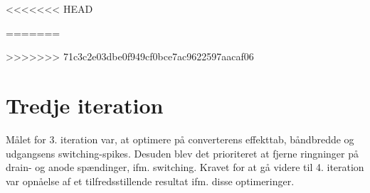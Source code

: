 
<<<<<<< HEAD




=======


>>>>>>> 71c3c2e03dbe0f949cf0bce7ac9622597aacaf06

\section{Tredje iteration}
Målet for 3. iteration var, at optimere på converterens effekttab, båndbredde og udgangsens switching-spikes. Desuden blev det prioriteret at fjerne ringninger på drain- og anode spændinger, ifm. switching.
Kravet for at gå videre til 4. iteration var opnåelse af et tilfredsstillende resultat ifm. disse optimeringer.















	
	
